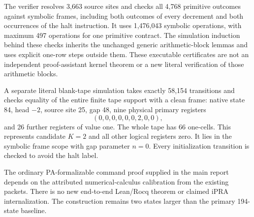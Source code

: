 The verifier resolves 3,663 source sites and checks all 4,768 primitive
outcomes against symbolic frames, including both outcomes of every
decrement and both occurrences of the halt instruction. It uses
1,476,043 symbolic operations, with maximum 497 operations for one
primitive contract. The simulation induction behind these checks
inherits the unchanged generic arithmetic-block lemmas and uses
explicit one-row steps outside them. These executable certificates
are not an independent proof-assistant kernel theorem or a new
literal verification of those arithmetic blocks.

A separate literal blank-tape simulation takes exactly 58,154
transitions and checks equality of the entire finite tape support
with a clean frame: native state 84, head $-2$, source site 25, gap 48,
nine physical primary registers
\[
 (0,0,0,0,0,0,2,0,0),
\]
and 26 further registers of value one. The whole tape has 66 one-cells.
This represents candidate $K=2$ and all other logical registers zero.
It lies in the symbolic frame scope with gap parameter $n=0$.
Every initialization transition is checked to avoid the halt label.

The ordinary PA-formalizable command proof supplied in the main report
depends on the attributed numerical-calculus calibration from the
existing packets. There is no new end-to-end Lean/Rocq theorem or
claimed iPRA internalization. The construction remains two states
larger than the primary 194-state baseline.
